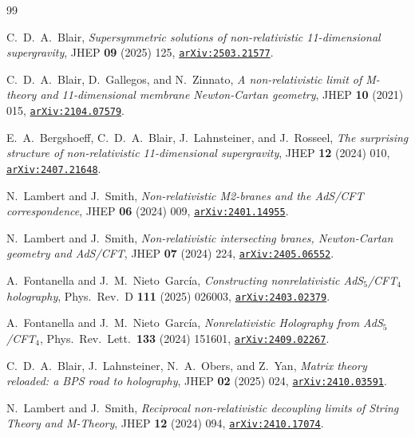 \documentclass[11pt]{article}
\begin{document}
\begingroup\small\raggedright
\begin{thebibliography}{99}

C.~D.~A.~Blair, \textit{Supersymmetric solutions of non-relativistic 11-dimensional supergravity}, JHEP \textbf{09} (2025) 125, \href{https://inspirehep.net/literature/2905034}{\texttt{arXiv:2503.21577}}.

C.~D.~A.~Blair, D.~Gallegos, and N.~Zinnato, \textit{A non-relativistic limit of M-theory and 11-dimensional membrane Newton-Cartan geometry}, JHEP \textbf{10} (2021) 015, \href{https://inspirehep.net/literature/1858447}{\texttt{arXiv:2104.07579}}.

E.~A.~Bergshoeff, C.~D.~A.~Blair, J.~Lahnsteiner, and J.~Rosseel, \textit{The surprising structure of non-relativistic 11-dimensional supergravity}, JHEP \textbf{12} (2024) 010, \href{https://inspirehep.net/literature/2813603}{\texttt{arXiv:2407.21648}}.

N.~Lambert and J.~Smith, \textit{Non-relativistic M2-branes and the AdS/CFT correspondence}, JHEP \textbf{06} (2024) 009, \href{https://inspirehep.net/literature/2751465}{\texttt{arXiv:2401.14955}}.

N.~Lambert and J.~Smith, \textit{Non-relativistic intersecting branes, Newton-Cartan geometry and AdS/CFT}, JHEP \textbf{07} (2024) 224, \href{https://inspirehep.net/literature/2785809}{\texttt{arXiv:2405.06552}}.

A.~Fontanella and J.~M.~Nieto~Garc\'ia, \textit{Constructing nonrelativistic AdS$_5$/CFT$_4$ holography}, Phys.\ Rev.\ D \textbf{111} (2025) 026003, \href{https://inspirehep.net/literature/2764652}{\texttt{arXiv:2403.02379}}.

A.~Fontanella and J.~M.~Nieto~Garc\'ia, \textit{Nonrelativistic Holography from AdS$_5$/CFT$_4$}, Phys.\ Rev.\ Lett.\ \textbf{133} (2024) 151601, \href{https://inspirehep.net/literature/2825245}{\texttt{arXiv:2409.02267}}.

C.~D.~A.~Blair, J.~Lahnsteiner, N.~A.~Obers, and Z.~Yan, \textit{Matrix theory reloaded: a BPS road to holography}, JHEP \textbf{02} (2025) 024, \href{https://inspirehep.net/literature/2837353}{\texttt{arXiv:2410.03591}}.

N.~Lambert and J.~Smith, \textit{Reciprocal non-relativistic decoupling limits of String Theory and M-Theory}, JHEP \textbf{12} (2024) 094, \href{https://inspirehep.net/literature/2842211}{\texttt{arXiv:2410.17074}}.


\end{thebibliography}
\end{document}
